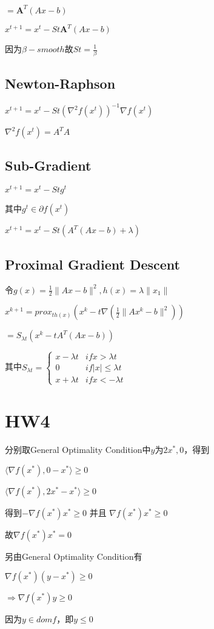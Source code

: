 \documentclass[12pt, a4paper, oneside, fontset=windows]{ctexart}
\begin{document}
$= \textbf{A}^{T}(Ax-b)$

$x^{t+1} = x^{t} -St\textbf{A}^{T}(Ax-b)$

因为$\beta-smooth$故$St = \frac{1}{\beta}$
\subsection{Newton-Raphson}
$x^{t+1} = x^{t} - St(\nabla^{2}f(x^{t}))^{-1}\nabla f(x^{t})$

$\nabla^{2} f(x^{t}) = A^{T}A$
\subsection{Sub-Gradient}
$x^{t+1} = x^{t} - Stg^{t}$

其中$g^{t} \in \partial f(x^{t})$

$x^{t+1} = x^{t} - St(A^{T}(Ax-b)+\lambda)$
\subsection{Proximal Gradient Descent}
令$g(x) = \frac{1}{2}\|Ax-b \|^{2}, h(x) = \lambda \|x_{1}\|$

$x^{k+1} = prox_{th(x)}(x^{k}-t\nabla(\frac{1}{2} \|Ax^{k} -b\|^{2}))$

$= S_{\lambda t}(x^{k} - tA^{T}(Ax-b))$\

其中$S_{\lambda t} = \left\{\begin{matrix}
    x-\lambda t & if x>\lambda t & \\ 
    0 &if|x|\leq \lambda t  & \\ 
    x+\lambda t & if x < -\lambda t & 
    \end{matrix}\right.$
\section{HW4}
分别取General Optimality Condition中$y$为$2x^{*},0$，得到

$\langle \nabla f(x^{*}), 0-x^{*} \rangle \geq 0$

$\langle \nabla f(x^{*}),2x^{*}-x^{*} \rangle \geq 0 $

得到$-\nabla f(x^{*})x^{*} \geq 0$ 并且 $\nabla f(x^{*})x^{*} \geq 0$

故$\nabla f(x^{*})x^{*} = 0$

另由General Optimality Condition有

$\nabla f(x^{*})(y-x^{*}) \geq 0$

$\Rightarrow \nabla f(x^{*})y \geq 0$

因为$y \in domf$，即$y \leq 0$
\end{document}
